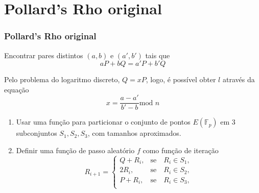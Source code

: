 \documentclass{beamer}
\newcounter{saveenumi}
\newcommand{\seti}{\setcounter{saveenumi}{\value{enumi}}}
\begin{document}

%
%

\section{Pollard's Rho original}
\begin{frame}
\frametitle{Pollard's Rho original}
Encontrar pares distintos $(a,b)$ e $(a',b')$ tais que
$$aP + bQ = a'P + b'Q$$

Pelo problema do logaritmo discreto, $Q = xP$, logo, é possível obter $l$ através da equação
$$x = \frac{a - a'}{b' - b} \mbox{mod }n$$
\end{frame}
\begin{frame}
  \begin{enumerate}
    \item Usar uma função para particionar o conjunto de pontos $E(\mathbb{F}_p)$ em 3 subconjuntos $S_1, S_2, S_3$, com tamanhos aproximados.
    \item Definir uma função de passo aleatório $f$ como função de iteração
    $$
      R_{i+1}=\left\{\begin{array}{rc}
      Q + R_i,&\mbox{se}\quad R_i \in S_1,\\
      2R_i,&\mbox{se}\quad R_i \in S_2,\\
      P + R_i,&\mbox{se}\quad R_i \in S_3,\\
      \end{array}\right.
    $$ 
    \seti
  \end{enumerate}
\end{frame}
\end{document}
